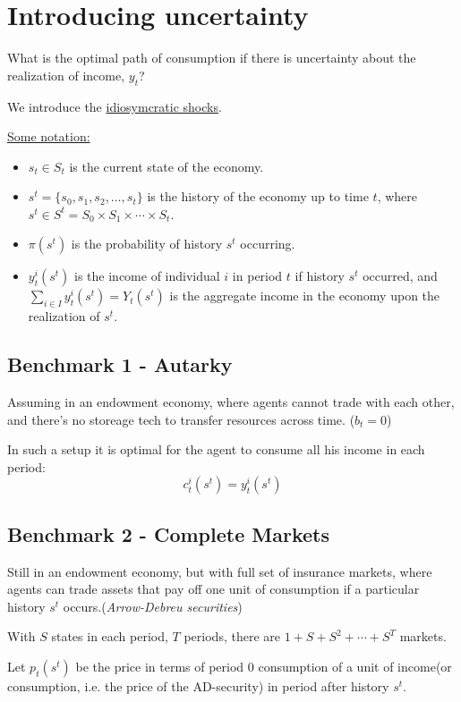 \section{Introducing uncertainty}

What is the optimal path of consumption if there is uncertainty
about the realization of income, $y_t$?

We introduce the \underline{idiosymcratic shocks}.

\underline{Some notation:}
\begin{itemize}
    \item $s_t \in S_t$ is the current state of the economy.
    \item $s^t = \{s_0, s_1, s_2, \dots, s_t\}$ is the history of the economy up to time $t$, where $s^t \in S^t = S_0 \times S_1 \times \cdots \times S_t$.
    \item $\pi(s^t)$ is the probability of history $s^t$ occurring.
    \item $y_t^i(s^t)$ is the income of individual $i$ in period $t$ if history $s^t$ occurred,
    and $\sum_{i \in I} y_t^i(s^t) = Y_t(s^t)$ is the aggregate income in the economy upon the realization of $s^t$.
\end{itemize}

\subsection{Benchmark 1 - Autarky}
Assuming in an endowment economy, where agents cannot trade with each other,
and there's no storeage tech to transfer resources across time. ($b_t = 0$)

In such a setup it is optimal for the agent to consume all his
income in each period:
\[c_t^i(s^t) = y_t^i(s^t)\]

\subsection{Benchmark 2 - Complete Markets}
Still in an endowment economy, but with full set of insurance markets, 
where agents can trade assets that pay off one unit of consumption if a
particular history $s^t$ occurs.(\textit{Arrow-Debreu securities})

With $S$ states in each period, $T$ periods, there are $1 + S + S^2 + \cdots + S^T$ markets.

Let $p_t(s^t)$ be the price in terms of period 0 consumption of a unit of income(or consumption,
i.e. the price of the AD-security) in period after history $s^t$.

